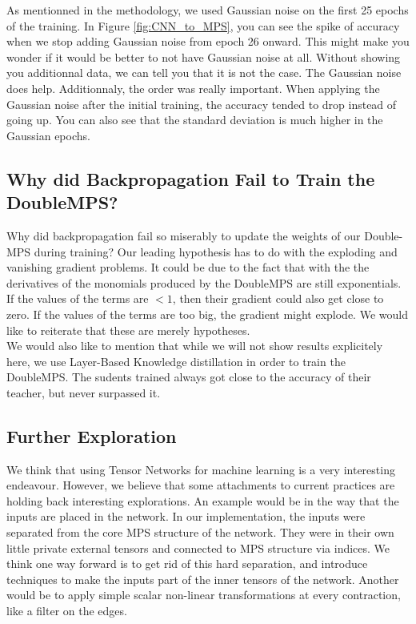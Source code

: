 \documentclass{article}
\theoremstyle{definition}
\theoremstyle{definition}
\begin{document}
As mentionned in the methodology, we used Gaussian noise on the first 25 epochs of the training. In Figure \ref{fig:CNN_to_MPS}, you can see the spike of accuracy when we stop adding Gaussian noise from epoch 26 onward. This might make you wonder if it would be better to not have Gaussian noise at all. Without showing you additionnal data, we can tell you that it is not the case. The Gaussian noise does help. Additionnaly, the order was really important. When applying the Gaussian noise after the initial training, the accuracy tended to drop instead of going up. You can also see that the standard deviation is much higher in the Gaussian epochs.



\subsection{Why did Backpropagation Fail to Train the DoubleMPS?}
Why did backpropagation fail so miserably to update the weights of our Double-MPS during training? Our leading hypothesis has to do with the exploding and vanishing gradient problems\cite{pascanu2013difficulty}. It could be due to the fact that with the the derivatives of the monomials produced by the DoubleMPS are still exponentials. If the values of the terms are $<1$, then their gradient could also get close to zero. If the values of the terms are too big, the gradient might explode. We would like to reiterate that these are merely hypotheses. \\

We would also like to mention that while we will not show results explicitely here, we use Layer-Based Knowledge distillation in order to train the DoubleMPS. The sudents trained always got close to the accuracy of their teacher, but never surpassed it.


\subsection{Further Exploration}
We think that using Tensor Networks for machine learning is a very interesting endeavour. However, we believe that some attachments to current practices are holding back interesting explorations. An example would be in the way that the inputs are placed in the network. In our implementation, the inputs were separated from the core MPS structure of the network. They were in their own little private external tensors and connected to MPS structure via indices. We think one way forward is to get rid of this hard separation, and introduce techniques to make the inputs part of the inner tensors of the network. Another would be to apply simple scalar non-linear transformations at every contraction, like a filter on the edges. \\
\end{document}
